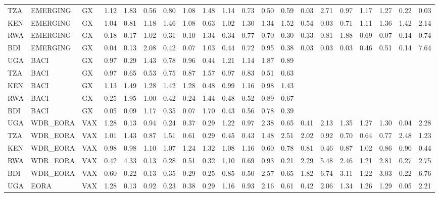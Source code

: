 \documentclass[a4paper]{article}
\begin{document}
\begin{table}[ht]
{\begin{tabular}{lllrrrrrrrrrrrrrrrrr}
  TZA & EMERGING & GX & 1.12 & 1.83 & 0.56 & 0.80 & 1.08 & 1.48 & 1.14 & 0.73 & 0.50 & 0.59 & 0.03 & 2.71 & 0.97 & 1.17 & 1.27 & 0.22 & 0.03 \\ 
  KEN & EMERGING & GX & 1.04 & 0.81 & 1.18 & 1.46 & 1.08 & 0.63 & 1.02 & 1.30 & 1.34 & 1.52 & 0.54 & 0.03 & 0.71 & 1.11 & 1.36 & 1.42 & 2.14 \\ 
  RWA & EMERGING & GX & 0.18 & 0.17 & 1.02 & 0.31 & 0.10 & 1.34 & 0.34 & 0.77 & 0.70 & 0.30 & 0.33 & 0.81 & 1.88 & 0.69 & 0.07 & 0.14 & 0.74 \\ 
  BDI & EMERGING & GX & 0.04 & 0.13 & 2.08 & 0.42 & 0.07 & 1.03 & 0.44 & 0.72 & 0.95 & 0.38 & 0.03 & 0.03 & 0.03 & 0.46 & 0.51 & 0.14 & 7.64 \\ \midrule
  UGA & BACI & GX & 0.97 & 0.29 & 1.43 & 0.78 & 0.96 & 0.44 & 1.21 & 1.14 & 1.87 & 0.89 &  &  &  &  &  &  &  \\ 
  TZA & BACI & GX & 0.97 & 0.65 & 0.53 & 0.75 & 0.87 & 1.57 & 0.97 & 0.83 & 0.51 & 0.63 &  &  &  &  &  &  &  \\ 
  KEN & BACI & GX & 1.13 & 1.49 & 1.28 & 1.42 & 1.28 & 0.48 & 0.99 & 1.16 & 0.98 & 1.43 &  &  &  &  &  &  &  \\ 
  RWA & BACI & GX & 0.25 & 1.95 & 1.00 & 0.42 & 0.24 & 1.44 & 0.48 & 0.52 & 0.89 & 0.67 &  &  &  &  &  &  &  \\ 
  BDI & BACI & GX & 0.05 & 0.09 & 1.17 & 0.35 & 0.07 & 1.70 & 0.43 & 0.56 & 0.78 & 0.39 &  &  &  &  &  &  &  \\ \midrule
  UGA & WDR\_EORA & VAX & 1.28 & 0.13 & 0.94 & 0.24 & 0.37 & 0.29 & 1.22 & 0.97 & 2.38 & 0.65 & 0.41 & 2.13 & 1.35 & 1.27 & 1.30 & 0.04 & 2.28 \\ 
  TZA & WDR\_EORA & VAX & 1.01 & 1.43 & 0.87 & 1.51 & 0.61 & 0.29 & 0.45 & 0.43 & 1.48 & 2.51 & 2.02 & 0.92 & 0.70 & 0.64 & 0.77 & 2.48 & 1.23 \\ 
  KEN & WDR\_EORA & VAX & 0.98 & 0.98 & 1.10 & 1.07 & 1.24 & 1.32 & 1.08 & 1.16 & 0.60 & 0.78 & 0.81 & 0.46 & 0.87 & 1.02 & 0.86 & 0.90 & 0.44 \\ 
  RWA & WDR\_EORA & VAX & 0.42 & 4.33 & 0.13 & 0.28 & 0.51 & 0.32 & 1.10 & 0.69 & 0.93 & 0.21 & 2.29 & 5.48 & 2.46 & 1.21 & 2.81 & 0.27 & 2.75 \\ 
  BDI & WDR\_EORA & VAX & 0.60 & 0.22 & 0.13 & 0.35 & 0.29 & 0.25 & 0.85 & 0.50 & 2.57 & 0.65 & 1.82 & 6.74 & 3.11 & 1.22 & 3.03 & 0.22 & 6.76 \\ \midrule
  UGA & EORA & VAX & 1.28 & 0.13 & 0.92 & 0.23 & 0.38 & 0.29 & 1.16 & 0.93 & 2.16 & 0.61 & 0.42 & 2.06 & 1.34 & 1.26 & 1.29 & 0.05 & 2.21 \\ 

\end{tabular}}
\end{table}
\end{document}
